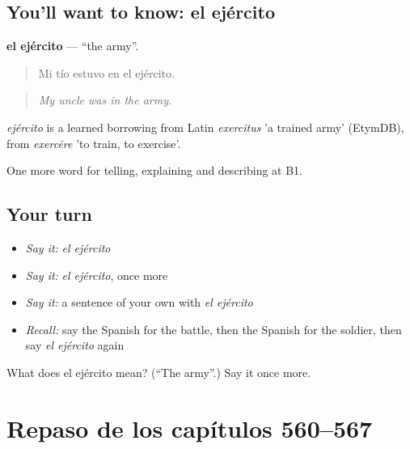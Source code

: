 \subsection*{You'll want to know: el ejército}
\textbf{el ejército} — \textquotedblleft{}the army\textquotedblright{}.

\begin{quote}
Mi tío estuvo en el ejército.
\end{quote}

\begin{quote}
\emph{My uncle was in the army.}
\end{quote}

\begin{cousinweb}
\emph{ejército} is a learned borrowing from Latin \emph{exercitus} 'a trained army' (EtymDB), from \emph{exercēre} 'to train, to exercise'.
\end{cousinweb}

\begin{grammarlens}[title={What you've built}]
One more word for telling, explaining and describing at B1.
\end{grammarlens}

\subsection*{Your turn}
\begin{itemize}
\raggedright
  \item \emph{Say it:} \emph{el ejército}
  \item \emph{Say it:} \emph{el ejército}, once more
  \item \emph{Say it:} a sentence of your own with \emph{el ejército}
  \item \emph{Recall:} say the Spanish for the battle, then the Spanish for the soldier, then say \emph{el ejército} again
\end{itemize}

\begin{tcolorbox}[breakable,colback=teal!4,colframe=teal!35!black,title={Before you move on}]
What does el ejército mean? (\textquotedblleft{}The army\textquotedblright{}.) Say it once more.
\end{tcolorbox}
\section[(dialogue)]{Repaso de los capítulos 560–567}

\label{lesson:ES-R567-repaso-560-567}



